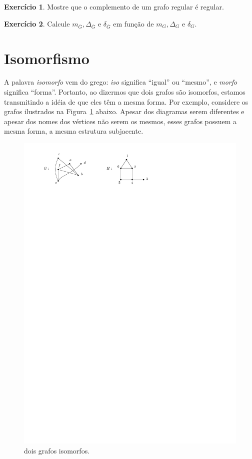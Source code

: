 \documentclass[12pt, a4paper]{article}
\theoremstyle{definition}
\newtheorem{exer}{Exercício}
\begin{document}
\begin{exer}
Mostre que o complemento de um grafo regular é regular.
\end{exer}

\begin{exer}
Calcule $m_{\overline{G}}, \Delta_{\overline{G}}$ e $\delta_{\overline{G}}$ em função de $m_G, \Delta_G$ e $\delta_G$.
\end{exer}

\section{Isomorfismo}

A palavra \emph{isomorfo} vem do grego: \emph{iso} significa ``igual'' ou ``mesmo'', e \emph{morfo} significa ``forma''. Portanto, ao dizermos que dois grafos são isomorfos, estamos transmitindo a idéia de que eles têm a mesma forma. Por exemplo, considere os grafos ilustrados na Figura~\ref{fig:dois_grafos} abaixo. Apesar dos diagramas serem diferentes e apesar dos nomes dos vértices não serem os mesmos, esses grafos possuem a mesma forma, a mesma estrutura subjacente.
\begin{figure}[H]
    \centering
    \includegraphics{isomorfos.pdf}
    \caption{dois grafos isomorfos.}
    \label{fig:dois_grafos}
\end{figure}
\end{document}
